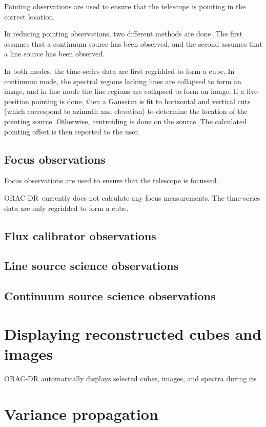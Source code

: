\documentclass[twoside,11pt,nolof]{starlink}
\providecommand{\ORACDR}{{\footnotesize ORAC-DR}}
\begin{document}
Pointing observations are used to ensure that the telescope is pointing in the
correct location.

In reducing pointing observations, two different methods are done. The first
assumes that a continuum source has been observed, and the second assumes that
a line source has been observed.

In both modes, the time-series data are first regridded to form a cube. In
continuum mode, the spectral regions lacking lines are collapsed to form an
image, and in line mode the line regions are collapsed to form an image. If a
five-position pointing is done, then a Gaussian is fit to horizontal and
vertical cuts (which correspond to azimuth and elevation) to determine the
location of the pointing source. Otherwise, centroiding is done on the
source. The calculated pointing offset is then reported to the user.

\subsection{Focus observations}

Focus observations are used to ensure that the telescope is focussed.

\ORACDR\ currently does not calculate any focus measurements. The time-series
data are only regridded to form a cube.

\subsection{Flux calibrator observations}

\subsection{Line source science observations}

\subsection{Continuum source science observations}

\section{Displaying reconstructed cubes and images}

ORAC-DR automatically displays selected cubes, images, and spectra during its

\section{Variance propagation}
\end{document}
